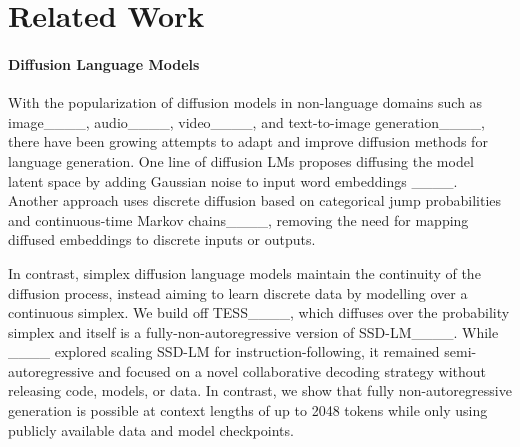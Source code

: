 \section{Related Work}
\paragraph{Diffusion Language Models} With the popularization of diffusion models in non-language domains such as image____, audio____, video____, and text-to-image generation____, there have been growing attempts to adapt and improve diffusion methods for language generation. One line of diffusion LMs proposes diffusing the model latent space by adding Gaussian noise to input word embeddings ____. Another approach uses discrete diffusion based on categorical jump probabilities and continuous-time Markov chains____, removing the need for mapping diffused embeddings to discrete inputs or outputs. 

In contrast, simplex diffusion language models maintain the continuity of the diffusion process, instead aiming to learn discrete data by modelling over a continuous simplex. We build off TESS____, which diffuses over the probability simplex and itself is a fully-non-autoregressive version of SSD-LM____. While ____ explored scaling SSD-LM for instruction-following, it remained semi-autoregressive and focused on a novel collaborative decoding strategy without releasing code, models, or data. In contrast, we show that fully non-autoregressive generation is possible at context lengths of up to 2048 tokens while only using publicly available data and model checkpoints.


